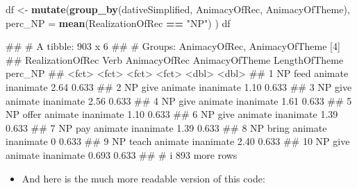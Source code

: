 \documentclass[
]{book}
\newenvironment{Shaded}{\begin{snugshade}}{\end{snugshade}}
\newcommand{\AttributeTok}[1]{\textcolor[rgb]{0.13,0.29,0.53}{#1}}
\newcommand{\FunctionTok}[1]{\textcolor[rgb]{0.13,0.29,0.53}{\textbf{#1}}}
\newcommand{\NormalTok}[1]{#1}
\newcommand{\OtherTok}[1]{\textcolor[rgb]{0.56,0.35,0.01}{#1}}
\newcommand{\SpecialCharTok}[1]{\textcolor[rgb]{0.81,0.36,0.00}{\textbf{#1}}}
\newcommand{\StringTok}[1]{\textcolor[rgb]{0.31,0.60,0.02}{#1}}
\providecommand{\tightlist}{%
  \setlength{\itemsep}{0pt}\setlength{\parskip}{0pt}}
\begin{document}
\begin{Shaded}
\begin{Highlighting}[]
\NormalTok{df }\OtherTok{\textless{}{-}} \FunctionTok{mutate}\NormalTok{(}\FunctionTok{group\_by}\NormalTok{(dativeSimplified, AnimacyOfRec, AnimacyOfTheme), }
                  \AttributeTok{perc\_NP =} \FunctionTok{mean}\NormalTok{(RealizationOfRec }\SpecialCharTok{==} \StringTok{"NP"}\NormalTok{) )}
\NormalTok{df}
\end{Highlighting}
\end{Shaded}

\begin{Shaded}
\begin{Highlighting}[]
\NormalTok{\#\# \# A tibble: 903 x 6}
\NormalTok{\#\# \# Groups:   AnimacyOfRec, AnimacyOfTheme [4]}
\NormalTok{\#\#    RealizationOfRec Verb  AnimacyOfRec AnimacyOfTheme LengthOfTheme perc\_NP}
\NormalTok{\#\#    \textless{}fct\textgreater{}            \textless{}fct\textgreater{} \textless{}fct\textgreater{}        \textless{}fct\textgreater{}                  \textless{}dbl\textgreater{}   \textless{}dbl\textgreater{}}
\NormalTok{\#\#  1 NP               feed  animate      inanimate              2.64    0.633}
\NormalTok{\#\#  2 NP               give  animate      inanimate              1.10    0.633}
\NormalTok{\#\#  3 NP               give  animate      inanimate              2.56    0.633}
\NormalTok{\#\#  4 NP               give  animate      inanimate              1.61    0.633}
\NormalTok{\#\#  5 NP               offer animate      inanimate              1.10    0.633}
\NormalTok{\#\#  6 NP               give  animate      inanimate              1.39    0.633}
\NormalTok{\#\#  7 NP               pay   animate      inanimate              1.39    0.633}
\NormalTok{\#\#  8 NP               bring animate      inanimate              0       0.633}
\NormalTok{\#\#  9 NP               teach animate      inanimate              2.40    0.633}
\NormalTok{\#\# 10 NP               give  animate      inanimate              0.693   0.633}
\NormalTok{\#\# \# i 893 more rows}
\end{Highlighting}
\end{Shaded}

\begin{itemize}
\tightlist
\item
  And here is the much more readable version of this code:
\end{itemize}
\end{document}

